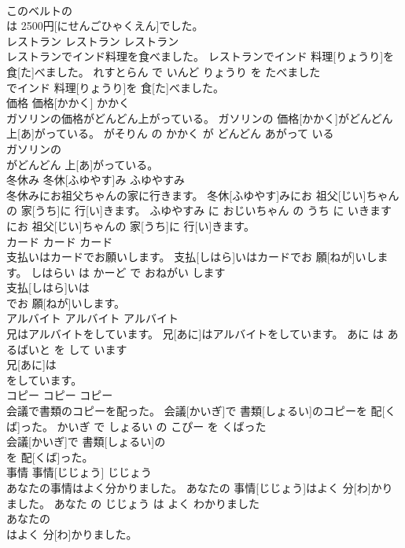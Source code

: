 \documentclass[8pt]{extreport}
\begin{document}
\begin{CJK}{UTF8}{min}
\\	このベルトの
\\	は 2500円[にせんごひゃくえん]でした。			
\\	レストラン	レストラン	レストラン	
\\	レストランでインド料理を食べました。	レストランでインド 料理[りょうり]を 食[た]べました。	れすとらん で いんど りょうり を たべました	
\\	でインド 料理[りょうり]を 食[た]べました。			
\\	価格	価格[かかく]	かかく	
\\	ガソリンの価格がどんどん上がっている。	ガソリンの 価格[かかく]がどんどん 上[あ]がっている。	がそりん の かかく が どんどん あがって いる	
\\	ガソリンの
\\	がどんどん 上[あ]がっている。			
\\	冬休み	冬休[ふゆやす]み	ふゆやすみ	
\\	冬休みにお祖父ちゃんの家に行きます。	冬休[ふゆやす]みにお 祖父[じい]ちゃんの 家[うち]に 行[い]きます。	ふゆやすみ に おじいちゃん の うち に いきます	
\\	にお 祖父[じい]ちゃんの 家[うち]に 行[い]きます。			
\\	カード	カード	カード	
\\	支払いはカードでお願いします。	支払[しはら]いはカードでお 願[ねが]いします。	しはらい は かーど で おねがい します	
\\	支払[しはら]いは
\\	でお 願[ねが]いします。			
\\	アルバイト	アルバイト	アルバイト	
\\	兄はアルバイトをしています。	兄[あに]はアルバイトをしています。	あに は あるばいと を して います	
\\	兄[あに]は
\\	をしています。			
\\	コピー	コピー	コピー	
\\	会議で書類のコピーを配った。	会議[かいぎ]で 書類[しょるい]のコピーを 配[くば]った。	かいぎ で しょるい の こぴー を くばった	
\\	会議[かいぎ]で 書類[しょるい]の
\\	を 配[くば]った。			
\\	事情	事情[じじょう]	じじょう	
\\	あなたの事情はよく分かりました。	あなたの 事情[じじょう]はよく 分[わ]かりました。	あなた の じじょう は よく わかりました	
\\	あなたの
\\	はよく 分[わ]かりました。			

\end{CJK}
\end{document}

